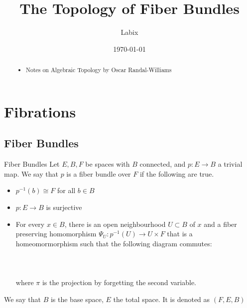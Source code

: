 \documentclass[a4paper]{article}
\title{The Topology of Fiber Bundles}
\author{Labix}
\date{\today}
\begin{document}
\maketitle
\begin{abstract}
\begin{itemize}
\item Notes on Algebraic Topology by Oscar Randal-Williams
\end{itemize}
\end{abstract}
\pagebreak
\tableofcontents

\pagebreak
\section{Fibrations}
\subsection{Fiber Bundles}
\begin{defn}{Fiber Bundles}{} Let $E,B,F$ be spaces with $B$ connected, and $p:E\to B$ a trivial map. We say that $p$ is a fiber bundle over $F$ if the following are true. 
\begin{itemize}
\item $p^{-1}(b)\cong F$ for all $b\in B$
\item $p:E\to B$ is surjective
\item For every $x\in B$, there is an open neighbourhood $U\subset B$ of $x$ and a fiber preserving homomorphism $\Psi_U:p^{-1}(U)\to U\times F$ that is a homeomormorphism such that the following diagram commutes: \\~\\
\\~\\
where $\pi$ is the projection by forgetting the second variable. 
\end{itemize}
We say that $B$ is the base space, $E$ the total space. It is denoted as $(F,E,B)$
\end{defn}
\end{document}
